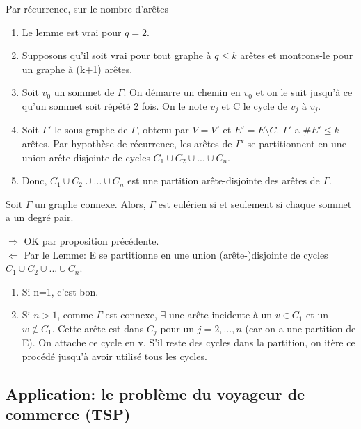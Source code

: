 \begin{demo}
Par récurrence, sur le nombre d'arêtes
	\begin{enumerate}
		\item Le lemme est vrai pour $q=2$.
		\item Supposons qu'il soit vrai pour tout graphe à $q \leq k$ arêtes et montrons-le pour un graphe à (k+1) arêtes.
		\item Soit $v_{0}$ un sommet de $\Gamma$. On démarre un chemin en $v_{0}$ et on le suit jusqu'à ce qu'un sommet soit répété 2 fois. On le note $v_{j}$ et C le cycle de $v_{j}$ à $v_{j}$.
		\item Soit ${\Gamma}'$ le sous-graphe de $\Gamma$, obtenu par $V={V}'$ et ${E}'=E \setminus C$. ${\Gamma}'$ a $\#{E}' \leq k$ arêtes. Par hypothèse de récurrence, les arêtes de ${\Gamma}'$ se partitionnent en une union arête-disjointe de cycles $C_{1} \cup C_{2} \cup ... \cup C_{n}$.
		\item Donc, $C_{1} \cup C_{2} \cup ... \cup C_{n}$ est une partition arête-disjointe des arêtes de $\Gamma$.\\
	\end{enumerate}
\end{demo}

\begin{thrm}
Soit $\Gamma$ un graphe connexe. Alors, $\Gamma$ est eulérien si et seulement si chaque sommet a un degré pair.\\
\end{thrm}

\begin{demo}
$\Rightarrow$ OK par proposition précédente.\\
$\Leftarrow$ Par le Lemme: E se partitionne en une union (arête-)disjointe de cycles $C_{1} \cup C_{2} \cup ... \cup C_{n}$.
	\begin{enumerate}
		\item Si n=1, c'est bon.
		\item Si $n>1$, comme $\Gamma$ est connexe, $\exists$ une arête incidente à un $v \in C_{1}$ et un $w \notin C_{1}$. Cette arête est dans $C_{j}$ pour un $j=2,...,n$ (car on a une partition de E). On attache ce cycle en v. S'il reste des cycles dans la partition, on itère ce procédé jusqu'à avoir utilisé tous les cycles.\\
	\end{enumerate}
\end{demo}

\subsection{Application: le problème du voyageur de commerce (TSP)}

